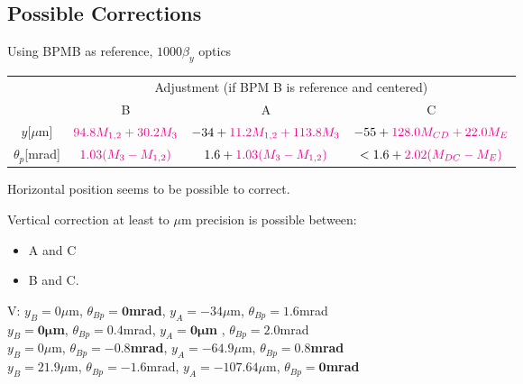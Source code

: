 \subsection{Possible Corrections}
Using BPMB as reference,  $1000\beta_y$ optics\par
\begin{tabular}{|c||c|c|c|}\hline
 &\multicolumn{3}{|c|}{Adjustment (if BPM B is reference and centered)}\\\cline{2-4}
 & B & A & C\\\hline\hline
$y$[$\mu$m]& ${\color{magenta}94.8M_{1,2}+30.2M_3}$ & $-34+{\color{magenta}11.2M_{1,2}+113.8M_3}$&$-55+{\color{magenta}128.0M_{CD}+22.0M_E}$\\
$\theta_{p}$[mrad]& ${\color{magenta}1.03(M_3-M_{1,2})}$ & $1.6+{\color{magenta}1.03(M_3-M_{1,2})}$ &$<1.6+{\color{magenta} 2.02(M_{DC}-M_E)}$\\\hline
\end{tabular}\par
Horizontal position seems to be possible to correct.\par
Vertical correction at least to $\mu$m precision is possible between:
\begin{itemize}
 \item A and C
 \item B and C.
\end{itemize}
V:\hspace*{0.1cm} $y_B=0\mu$m, $\theta_{Bp}=\boldsymbol{0}$\textbf{mrad},\hspace{10mm} $y_A=-34\mu$m, $\theta_{Bp}=1.6$mrad\\
\hspace*{0.45cm} $y_B=\boldsymbol{0\mu}$\textbf{m}, $\theta_{Bp}=0.4$mrad,\hspace{7mm} $y_A=\boldsymbol{0\mu}$\textbf{m	}, $\theta_{Bp}=2.0$mrad\\
\hspace*{0.45cm} $y_B=0\mu$m, $\theta_{Bp}=\boldsymbol{-0.8}$\textbf{mrad},\hspace{3mm} $y_A=-64.9\mu$m, $\theta_{Bp}=\boldsymbol{0.8}$\textbf{mrad}\\
\hspace*{0.45cm} $y_B=21.9\mu$m, $\theta_{Bp}=-1.6$mrad, $y_A=-107.64\mu$m, $\theta_{Bp}=\boldsymbol{0}$\textbf{mrad}\\